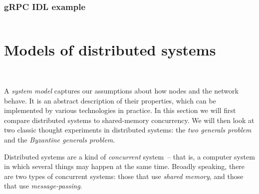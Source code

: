 \begin{frame}
    \label{s:rpc-idl}
    \frametitle{gRPC IDL example}
    \inputminted[fontsize=\scriptsize]{protobuf}{code/payment-rpc.proto}
\end{frame}
\label{l:rpc-idl}

\section{Models of distributed systems}\label{sec:system-models}

\begin{frame}
    \begin{center}
        {\Large{\color{tumblue}{Models of distributed systems}}} \\[2em]
        \mydetails
    \end{center}
\end{frame}

A \emph{system model} captures our assumptions about how nodes and the network behave.
It is an abstract description of their properties, which can be implemented by various technologies in practice.
In this section we will first compare distributed systems to shared-memory concurrency.
We will then look at two classic thought experiments in distributed systems: the \emph{two generals problem} and the \emph{Byzantine generals problem}.

Distributed systems are a kind of \emph{concurrent} system~-- that is, a computer system in which several things may happen at the same time.
Broadly speaking, there are two types of concurrent systems: those that use \emph{shared memory}, and those that use \emph{message-passing}.

